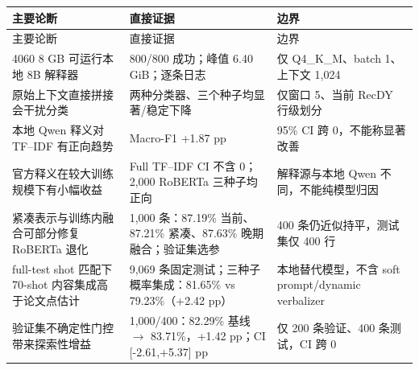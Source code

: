 \documentclass[UTF8,zihao=-4,a4paper]{ctexart}
\begin{document}
\begin{longtable}{p{5.1cm}p{5.4cm}p{4.3cm}}
\toprule
主要论断 & 直接证据 & 边界 \\
\midrule
\endfirsthead
\toprule
主要论断 & 直接证据 & 边界 \\
\midrule
\endhead
4060 8 GB 可运行本地 8B 解释器 & 800/800 成功；峰值 6.40 GiB；逐条日志 & 仅 Q4\_K\_M、batch 1、上下文 1,024 \\
原始上下文直接拼接会干扰分类 & 两种分类器、三个种子均显著/稳定下降 & 仅窗口 5、当前 RecDY 行级划分 \\
本地 Qwen 释义对 TF--IDF 有正向趋势 & Macro-F1 +1.87 pp & 95\% CI 跨 0，不能称显著改善 \\
官方释义在较大训练规模下有小幅收益 & Full TF--IDF CI 不含 0；2,000 RoBERTa 三种子均正向 & 解释源与本地 Qwen 不同，不能纯模型归因 \\
紧凑表示与训练内融合可部分修复 RoBERTa 退化 & 1,000 条：87.19\% 当前、87.21\% 紧凑、87.63\% 晚期融合；验证集选参 & 400 条仍近似持平，测试集仅 400 行 \\
full-test shot 匹配下 70-shot 内容集成高于论文点估计 & 9,069 条固定测试；三种子概率集成：81.65\% vs 79.23\%（+2.42 pp） & 本地替代模型，不含 soft prompt/dynamic verbalizer \\
验证集不确定性门控带来探索性增益 & 1,000/400：82.29\% 基线 $\to$ 83.71\%，+1.42 pp；CI [-2.61,+5.37] pp & 仅 200 条验证、400 条测试，CI 跨 0 \\
\bottomrule
\end{longtable}

\printbibliography[heading=bibintoc,title={参考文献}]
\end{document}
